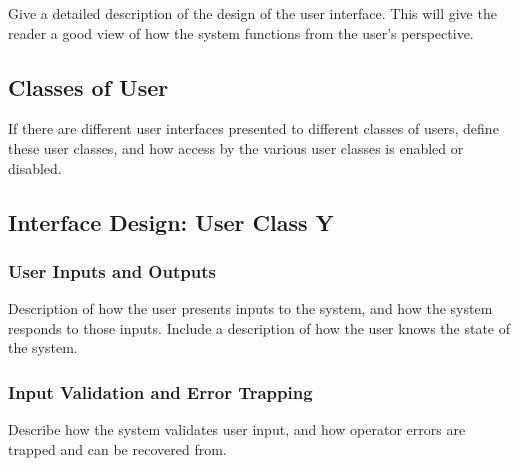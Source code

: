\documentclass[MTRX3700report.tex]{subfiles}
\begin{document}
Give a detailed description of the design of the user interface. This will give the reader a good view of how the system functions from the user’s perspective.
\subsection{Classes of User}
If there are different user interfaces presented to different classes of users, define these user classes, and how access by the various user classes is enabled or disabled.
\subsection{Interface Design: User Class Y}
\subsubsection{User Inputs and Outputs}
Description of how the user presents inputs to the system, and how the system responds to those inputs. Include a description of how the user knows the state of the system.
\subsubsection{Input Validation and Error Trapping}
Describe how the system validates user input, and how operator errors are trapped and can be recovered from.
\end{document}
